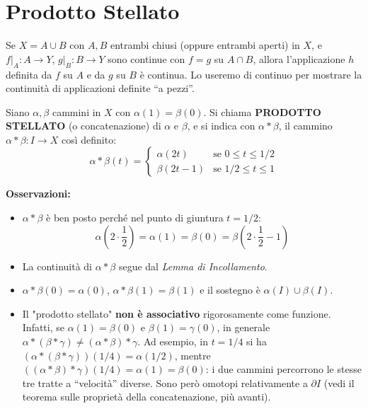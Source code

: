 \section{Prodotto Stellato}
\begin{notacion}
Se $X = A \cup B$ con $A, B$ entrambi chiusi (oppure entrambi aperti) in $X$, e $f|_A: A \to Y$, $g|_B: B \to Y$ sono continue con $f = g$ su $A \cap B$, allora l'applicazione $h$ definita da $f$ su $A$ e da $g$ su $B$ \`e continua. Lo useremo di continuo per mostrare la continuit\`a di applicazioni definite ``a pezzi''.
\end{notacion}

Siano $\alpha, \beta$ cammini in $X$ con $\alpha(1) = \beta(0)$. Si chiama \textbf{PRODOTTO STELLATO} (o concatenazione) di $\alpha$ e $\beta$, e si indica con $\alpha * \beta$, il cammino $\alpha * \beta: I \to X$ cos\`i definito:
\[ 
\alpha * \beta(t) = 
\begin{cases} 
\alpha(2t) & \text{se } 0 \leq t \leq 1/2 \\
\beta(2t-1) & \text{se } 1/2 \leq t \leq 1 
\end{cases}
\]

\textbf{Osservazioni:}
\begin{itemize}
    \item $\alpha * \beta$ \`e ben posto perch\'e nel punto di giuntura $t = 1/2$: 
    \[ \alpha\left(2 \cdot \frac{1}{2}\right) = \alpha(1) = \beta(0) = \beta\left(2 \cdot \frac{1}{2} - 1\right) \]
    \item La continuit\`a di $\alpha * \beta$ segue dal \textit{Lemma di Incollamento}.
    \item $\alpha * \beta(0) = \alpha(0)$, $\alpha * \beta(1) = \beta(1)$ e il sostegno \`e $\alpha(I) \cup \beta(I)$.
    \item Il "prodotto stellato" \textbf{non \`e associativo} rigorosamente come funzione. Infatti, se $\alpha(1) = \beta(0)$ e $\beta(1) = \gamma(0)$, in generale $\alpha * (\beta * \gamma) \neq (\alpha * \beta) * \gamma$. Ad esempio, in $t = 1/4$ si ha $(\alpha * (\beta * \gamma))(1/4) = \alpha(1/2)$, mentre $((\alpha * \beta) * \gamma)(1/4) = \alpha(1) = \beta(0)$: i due cammini percorrono le stesse tre tratte a ``velocit\`a'' diverse. Sono per\`o omotopi relativamente a $\partial I$ (vedi il teorema sulle propriet\`a della concatenazione, pi\`u avanti).
\end{itemize}

